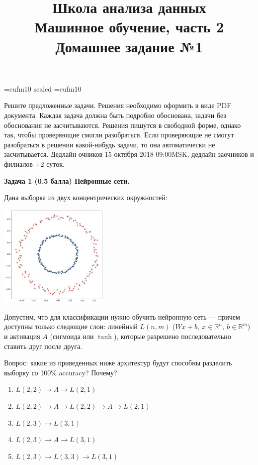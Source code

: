 \documentclass[10pt]{article}
\title{Школа анализа данных\\Машинное обучение, часть 2\\Домашнее задание №1}
\author{}
\date{}
\begin{document}
\voffset=-20mm
\hoffset=-17mm
\font\Got=eufm10 scaled \font\Got=eufm10


\maketitle

Решите предложенные задачи. Решения необходимо оформить в виде PDF документа. Каждая задача должна быть подробно обоснована, задачи без обоснования не засчитываются. Решения пишутся в свободной форме, однако так, чтобы проверяющие смогли разобраться. Если проверяющие не смогут разобраться в решении какой-нибудь задачи, то она автоматически не засчитывается. Дедлайн очников 15 октября 2018 09:00MSK, дедлайн заочников и филиалов +2 суток.


\bigskip

\textbf{Задача 1 (0.5 балла) Нейронные сети.}


Дана выборка из двух концентрических окружностей:
\begin{center}
    \includegraphics[width=200px]{circles.jpg}
\end{center}

Допустим, что для классификации нужно обучить нейронную сеть — причем доступны только следющие слои: линейный $L(n, m)$ ($Wx+b,~x\in\mathbb{R}^{n},~b\in\mathbb{R}^{m}$)  и активация $A$  (сигмоида или $\tanh$), которые разрешено последовательно ставить друг после друга.

Вопрос: какие из приведенных ниже архитектур будут способны разделить выборку со 100\% accuracy? Почему?

\begin{enumerate}
    \item $L(2, 2)\to A\to L(2, 1)$
    \item $L(2, 2) \to A \to L(2, 2) \to A \to L(2, 1)$
    \item $L(2, 3) \to L(3, 1)$
    \item $L(2, 3) \to A \to L(3, 1)$
    \item $L(2, 3) \to L(3, 3) \to L(3, 1)$
\end{enumerate}
\end{document}
